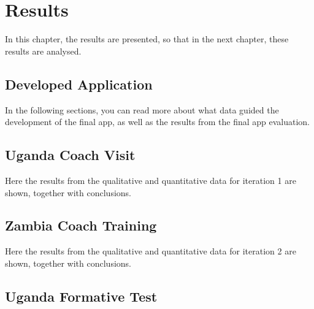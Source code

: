 \chapter{Results}\label{cha:Research}
%


In this chapter, the results are presented, so that in the next chapter, these results are analysed. 

%

\section{Developed Application}

  

In the following sections, you can read more about what data guided the development of the final app, as well as the results from the final app evaluation.

\section{Uganda Coach Visit}

Here the results from the qualitative and quantitative data for iteration 1 are shown, together with conclusions.





\section{Zambia Coach Training}

Here the results from the qualitative and quantitative data for iteration 2 are shown, together with conclusions.





\section{Uganda Formative Test}

